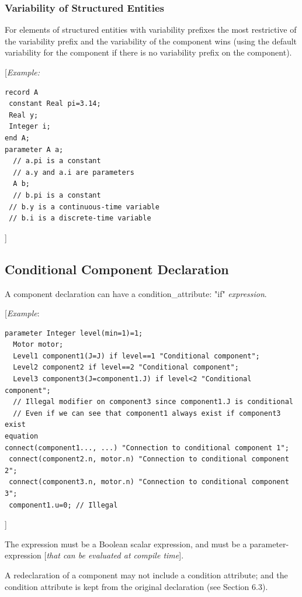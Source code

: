 \documentclass[10pt,a4paper]{report}
\def\Mcomment#1{{[}\emph{#1}{]}}
\def\Mcommentbegin#1{{[}\emph{#1}}
\def\Mcommentend#1{\emph{#1}{]}}
\def\doublelabel#1{\label{#1}\hypertarget{#1}{}}
\begin{document}
\subsubsection{Variability of Structured Entities}\doublelabel{variability-of-structured-entities}

For elements of structured entities with variability prefixes the most
restrictive of the variability prefix and the variability of the
component wins (using the default variability for the component if there
is no variability prefix on the component).

\Mcommentbegin{Example:}
\begin{lstlisting}[language=modelica]
record A
 constant Real pi=3.14;
 Real y;
 Integer i;
end A;
parameter A a;
  // a.pi is a constant
  // a.y and a.i are parameters
  A b; 
  // b.pi is a constant
 // b.y is a continuous-time variable
 // b.i is a discrete-time variable
\end{lstlisting}
\Mcommentend{}

\subsection{Conditional Component Declaration}\doublelabel{conditional-component-declaration}

A component declaration can have a condition\_attribute: "if" \emph{expression}.

\Mcommentbegin{Example}:
\begin{lstlisting}[language=modelica]
  parameter Integer level(min=1)=1;
  Motor motor;
  Level1 component1(J=J) if level==1 "Conditional component";
  Level2 component2 if level==2 "Conditional component";
  Level3 component3(J=component1.J) if level<2 "Conditional component";
  // Illegal modifier on component3 since component1.J is conditional
  // Even if we can see that component1 always exist if component3 exist
equation
connect(component1..., ...) "Connection to conditional component 1";
 connect(component2.n, motor.n) "Connection to conditional component 2";
 connect(component3.n, motor.n) "Connection to conditional component 3";
 component1.u=0; // Illegal
\end{lstlisting}
\Mcommentend{}

The expression must be a Boolean scalar expression, and must be a
parameter-expression \Mcomment{that can be evaluated at compile time}.

A redeclaration of a component may not include a condition attribute;
and the condition attribute is kept from the original declaration (see
Section 6.3).
\end{document}
